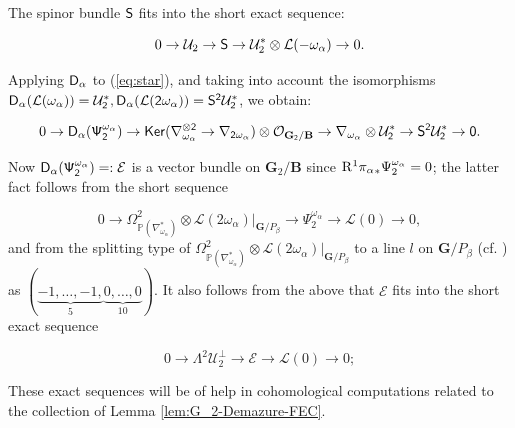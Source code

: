 \documentclass[sn-mathphys-num]{sn-jnl}%
\newcommand{\Oo}{\mathcal O}
\newcommand{\Uu}{\mathcal U}
\newcommand{\Ee}{\mathcal E}
\newcommand{\Ll}{\mathcal L}
\newcommand{\sd}{\sf D}
\newcommand{\Pp}{\mathbb P}
\newcommand{\bg}{\mathbf G}
\newcommand{\fb}{\mathbf B}
\theoremstyle{definition}
\begin{document}
The spinor bundle $\sf S$ fits into the short exact sequence:

\begin{equation}\label{eq:S-to-U_2}
0\rightarrow \Uu _2\rightarrow {\sf S}\rightarrow \Uu _2^{\ast}\otimes \Ll (-\omega _{\alpha})\rightarrow 0.
\end{equation}

Applying $\sd _{\alpha}$ to (\ref{eq:star}), and taking into account the isomorphisms $\sd _{\alpha}(\Ll (\omega _{\alpha}))=\Uu _2^{\ast}, \sd _{\alpha}(\Ll (2\omega _{\alpha}))={\sf S}^2\Uu _2^{\ast}$, 
we obtain:

\begin{equation}\label{eq:d_alphaPsi^2_alpha}
0\rightarrow \sd _{\alpha}(\Psi _2^{\omega _{\alpha}})\rightarrow {\sf Ker}(\nabla _{\omega _{\alpha}}^{\otimes 2}\rightarrow \nabla _{2\omega _{\alpha}})\otimes \Oo _{{ \bg}_2/{\fb}}\rightarrow \nabla _{\omega _{\alpha}}\otimes \Uu _2^{\ast}\rightarrow {\sf S}^2\Uu _2^{\ast}\rightarrow 0.
\end{equation}

Now $\sd _{\alpha}(\Psi _2^{\omega _{\alpha}})=:\Ee$ is a vector bundle on $ \bg _2/ \fb$ since ${\rm R}^1{\pi _{\alpha}}_{\ast}\Psi _2^{\omega _{\alpha}}=0$; the latter fact follows from the short sequence 

\begin{equation}
0\rightarrow \Omega ^2_{  \Pp (\nabla _{\omega _{\alpha}}^{\ast})}\otimes \Ll (2\omega _{\alpha})|_{ \bg/P _{\beta}}\rightarrow \Psi _2^{\omega _{\alpha}}\rightarrow \Ll (0)\rightarrow 0,
\end{equation}
and from the splitting type of $\Omega ^2_{  \Pp (\nabla _{\omega _{\alpha}}^{\ast})}\otimes \Ll (2\omega _{\alpha})|_{ \bg/P _{\beta}}$ to a line $l$ on $ \bg/P _{\beta}$ (cf. \cite[Section 4]{Str}) as $(\underbrace{-1,\dots,-1,}_5\underbrace{0,\dots,0}_{10})$. It also follows from the above that $\Ee$ fits into the short exact sequence 

\begin{equation}\label{eq:E}
0\rightarrow \Lambda ^2\Uu _2^{\perp}\rightarrow \Ee\rightarrow \Ll (0)\rightarrow 0;
\end{equation}

These exact sequences will be of help in cohomological computations related to the collection of Lemma \ref{lem:G_2-Demazure-FEC}.
\end{document}
